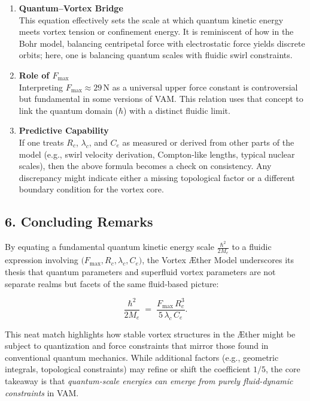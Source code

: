 \begin{enumerate}
    \item \textbf{Quantum–Vortex Bridge} \\
    This equation effectively sets the scale at which quantum kinetic energy meets vortex tension or confinement energy. It is reminiscent of how in the Bohr model, balancing centripetal force with electrostatic force yields discrete orbits; here, one is balancing quantum scales with fluidic swirl constraints.
    \item \textbf{Role of \(F_{\max}\)} \\
    Interpreting \(F_{\max}\approx 29\,\mathrm{N}\) as a universal upper force constant is controversial but fundamental in some versions of VAM. This relation uses that concept to link the quantum domain (\(\hbar\)) with a distinct fluidic limit.
    \item \textbf{Predictive Capability} \\
    If one treats \(R_c\), \(\lambda_c\), and \(C_e\) as measured or derived from other parts of the model (e.g., swirl velocity derivation, Compton-like lengths, typical nuclear scales), then the above formula becomes a check on consistency. Any discrepancy might indicate either a missing topological factor or a different boundary condition for the vortex core.
\end{enumerate}

\subsection*{6. Concluding Remarks}

By equating a fundamental quantum kinetic energy scale \(\tfrac{\hbar^2}{2M_e}\) to a fluidic expression involving \(\bigl(F_{\max}, R_c, \lambda_c, C_e\bigr)\), the Vortex Æther Model underscores its thesis that quantum parameters and superfluid vortex parameters are not separate realms but facets of the same fluid-based picture:

\[
    \boxed{
        \frac{\hbar^2}{2 M_e}
        \;=\;
        \frac{F_{\text{max}} \, R_c^3}{5 \,\lambda_c\,C_e}.
    }
\]

This neat match highlights how stable vortex structures in the Æther might be subject to quantization and force constraints that mirror those found in conventional quantum mechanics. While additional factors (e.g., geometric integrals, topological constraints) may refine or shift the coefficient \(1/5\), the core takeaway is that \textit{quantum-scale energies can emerge from purely fluid-dynamic constraints} in VAM.